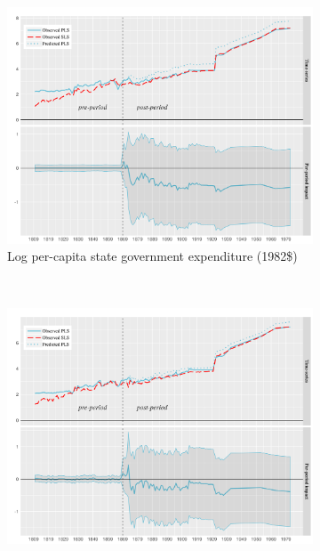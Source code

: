 \documentclass[12pt]{article}
\begin{document}
\begin{figure}[htbp]
	\centering
	\begin{subfigure}[t]{0.75\textwidth}
		\centering
		\includegraphics[width=\textwidth]{plots/mc-exp-pc.png}
		\caption{Log per-capita state government expenditure (1982\$)\label{mc-estimates-exp-pc}}
	\end{subfigure}
	~ 
	\begin{subfigure}[t]{0.75\textwidth}
		\centering
		\includegraphics[width=\textwidth]{plots/mc-rev-pc.png}

\end{subfigure}
\end{figure}
\end{document}
